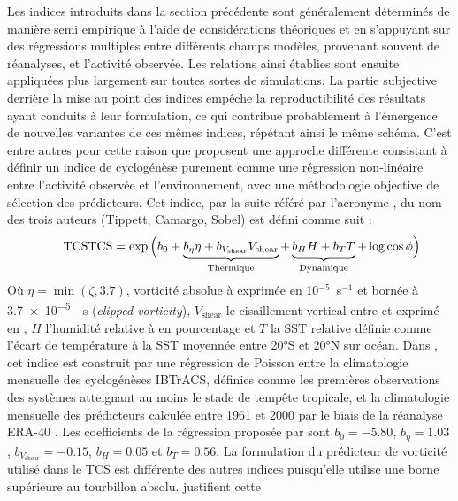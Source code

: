 \documentclass[../main.tex]{subfiles}
\begin{document}
Les indices introduits dans la section précédente sont généralement déterminés de manière semi empirique à l'aide de considérations théoriques et en s'appuyant
sur des régressions multiples entre différents champs modèles, provenant souvent de réanalyses, et l'activité observée. Les relations ainsi établies sont
ensuite appliquées plus largement sur toutes sortes de simulations. La partie subjective derrière la mise au point des indices empêche la reproductibilité des
résultats ayant conduits à leur formulation, ce qui contribue probablement à l'émergence de nouvelles variantes de ces mêmes indices, répétant ainsi le même
schéma. C'est entre autres pour cette raison que \textcite{tippett_poisson_2011} proposent une approche différente consistant à définir un indice de
cyclogénèse purement comme une régression non-linéaire entre l'activité observée et l'environnement, avec une méthodologie objective de sélection des
prédicteurs. Cet indice, par la suite référé par l'acronyme , du nom des trois auteurs (Tippett, Camargo, Sobel) est
défini comme suit :
%
\begin{equation*}
    \tag*{TCS}
    \mathrm{TCS} = \exp \Big( b_0 + \underbrace{b_\eta \eta + b_{V_{\mathrm{shear}}} V_{\mathrm{shear}}}_{\mathrm{Thermique}} + \underbrace{\vphantom{b_\eta}b_H H + b_T
    T}_{\mathrm{Dynamique}} + \log \cos \phi \Big)
\end{equation*}
%
Où $\eta = \min (\zeta, \num{3.7})$, vorticité absolue à  exprimée en 10$^{-5}$~s$^{-1}$ et bornée à \SI{3.7e-5}{\per\second} (\textit{clipped
vorticity}), $V_{\mathrm{shear}}$ le cisaillement vertical entre  et  exprimé en \ms{}, $H$ l'humidité relative à  en pourcentage et
$T$ la SST relative définie comme l'écart de température à la SST moyennée entre \ang{20}S et \ang{20}N sur océan. Dans \textcite{tippett_poisson_2011}, cet
indice est construit par une régression de Poisson entre la climatologie mensuelle des cyclogénèses IBTrACS, définies comme les premières observations des
systèmes atteignant au moins le stade de tempête tropicale, et la climatologie mensuelle des prédicteurs calculée entre \num{1961} et \num{2000} par le biais de
la réanalyse ERA-40 \parencite{uppala_era40_2005}. Les coefficients de la régression proposée par \citeauthor{tippett_poisson_2011} sont $b_0 = \num{-5.80}$,
$b_{\eta} = \num{1.03}$, $b_{V_{\mathrm{shear}}} = \num{-0.15}$, $b_H = \num{0.05}$ et $b_T = \num{0.56}$. La formulation du prédicteur de vorticité utilisé dans
le TCS est différente des autres indices puisqu'elle utilise une borne supérieure au tourbillon absolu. \textcite{tippett_poisson_2011} justifient cette
\end{document}
